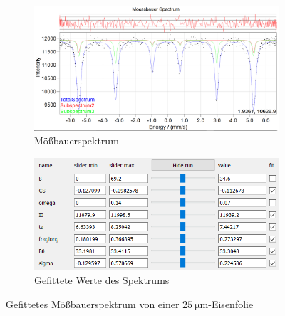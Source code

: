 \documentclass[german, %
parskip=full, %
bibliography=totoc, %
]{scrartcl}
\begin{document}
\begin{figure}[ht]
	\centering
	\begin{subfigure}[b]{0.5\textwidth}
		\includegraphics[width=\textwidth]{MoessbauerEisen25}
	  \caption{Mößbauerspektrum}
	  \label{fig:moess25}
  \end{subfigure}
  \begin{subfigure}[b]{0.4\textwidth}
	  \includegraphics[width=\textwidth]{WerteEisen25}
	  \caption{Gefittete Werte des Spektrums}
	  \label{fig:werte25}
  \end{subfigure}
	\caption{Gefittetes Mößbauerspektrum von einer \(\SI{25}{\micro\meter}\)-Eisenfolie}
\end{figure}
\end{document}
